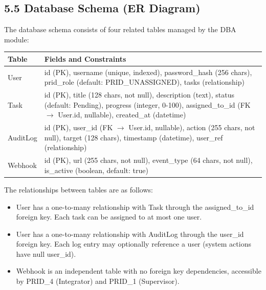 ﻿\documentclass[12pt]{article}
\begin{document}
\subsection*{5.5 Database Schema (ER Diagram)}
The database schema consists of four related tables managed by the DBA module:

\begin{center}
\begin{tabular}{|l|p{10cm}|}
\hline
\textbf{Table} & \textbf{Fields and Constraints} \\ \hline
User & id (PK), username (unique, indexed), password\_hash (256 chars), prid\_role (default: PRID\_UNASSIGNED), tasks (relationship) \\ \hline
Task & id (PK), title (128 chars, not null), description (text), status (default: Pending), progress (integer, 0-100), assigned\_to\_id (FK $\rightarrow$ User.id, nullable), created\_at (datetime) \\ \hline
AuditLog & id (PK), user\_id (FK $\rightarrow$ User.id, nullable), action (255 chars, not null), target (128 chars), timestamp (datetime), user\_ref (relationship) \\ \hline
Webhook & id (PK), url (255 chars, not null), event\_type (64 chars, not null), is\_active (boolean, default: true) \\ \hline
\end{tabular}
\end{center}

The relationships between tables are as follows:
\begin{itemize}
\item User has a one-to-many relationship with Task through the assigned\_to\_id foreign key. Each task can be assigned to at most one user.
\item User has a one-to-many relationship with AuditLog through the user\_id foreign key. Each log entry may optionally reference a user (system actions have null user\_id).
\item Webhook is an independent table with no foreign key dependencies, accessible by PRID\_4 (Integrator) and PRID\_1 (Supervisor).
\end{itemize}
\end{document}
